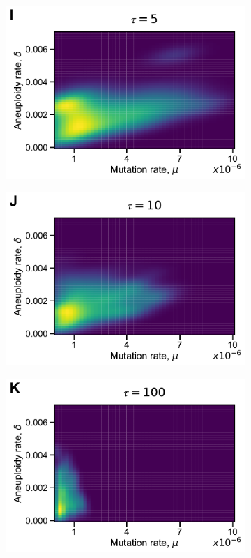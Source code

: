 \documentclass[12pt]{extarticle}
\begin{document}
\begin{figure}[h!]
\begin{subfigure}{0.325\textwidth}
      \includegraphics[width=\textwidth]{../figures/tau-joint-I.pdf}      
  \end{subfigure}
\begin{subfigure}{0.325\textwidth}
      \includegraphics[width=\textwidth]{../figures/tau-joint-J.pdf}      
  \end{subfigure}
\begin{subfigure}{0.325\textwidth}
      \includegraphics[width=\textwidth]{../figures/tau-joint-K.pdf}      

\end{subfigure}
\end{figure}
\end{document}
